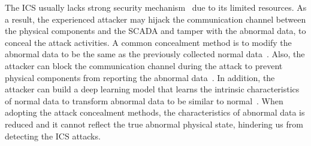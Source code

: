  The ICS usually lacks strong security mechanism~\cite{green2017significance} due to its limited resources. As a result, the experienced attacker may hijack the communication channel between the physical components and the SCADA and tamper with the abnormal data, to conceal the attack activities.
A common concealment method is to modify the abnormal data to be the same as the previously collected normal data~\cite{ahmed2016limitations,mo2009secure,taormina2018deep,taormina2018battle}. Also, the attacker can block the communication channel during the attack to prevent physical components from reporting the abnormal data~\cite{krotofil2014cps}. In addition, the attacker can build a deep learning model that learns the intrinsic characteristics of normal data to transform abnormal data to be similar to normal~\cite{erba2020constrained}. When adopting the attack concealment methods, the characteristics of abnormal data is reduced and it cannot reflect the true abnormal physical state, hindering us from detecting the ICS attacks.



